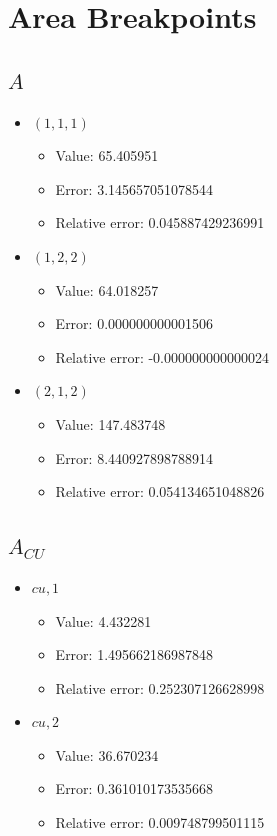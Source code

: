 \documentclass{article}%
\begin{document}
\section{Area Breakpoints}%
\thispagestyle{plain}%
\subsection{$A$}%
\begin{itemize}%
	\item $(1, 1, 1)$%
	\begin{itemize}%
		\item Value: 65.405951%
		\item Error: 3.145657051078544%
		\item Relative error: 0.045887429236991%
	\end{itemize}%
	\item $(1, 2, 2)$%
	\begin{itemize}%
		\item Value: 64.018257%
		\item Error: 0.000000000001506%
		\item Relative error: -0.000000000000024%
	\end{itemize}%
	\item $(2, 1, 2)$%
	\begin{itemize}%
		\item Value: 147.483748%
		\item Error: 8.440927898788914%
		\item Relative error: 0.054134651048826%
	\end{itemize}%
\end{itemize}%
\subsection{$A_{CU}$}%
\begin{itemize}%
	\item $\textit{cu},1$%
	\begin{itemize}%
		\item Value: 4.432281%
		\item Error: 1.495662186987848%
		\item Relative error: 0.252307126628998%
	\end{itemize}%
	\item $\textit{cu},2$%
	\begin{itemize}%
		\item Value: 36.670234%
		\item Error: 0.361010173535668%
		\item Relative error: 0.009748799501115%
	\end{itemize}%
\end{itemize}%
\end{document}

